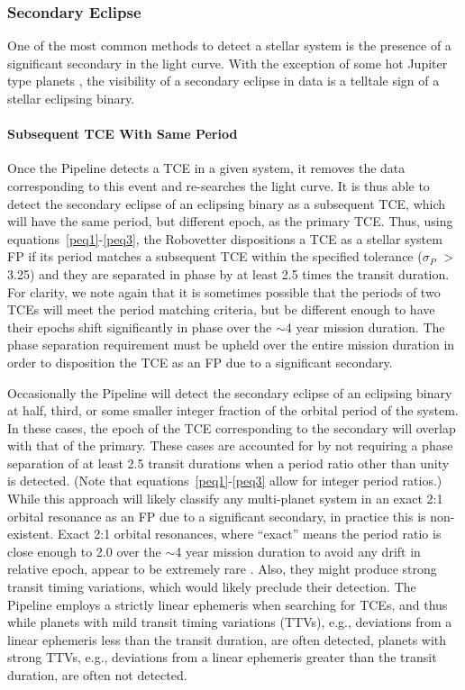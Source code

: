 \subsubsection{Secondary Eclipse}

One of the most common methods to detect a stellar system is the presence of a significant secondary in the light curve. With the exception of some hot Jupiter type planets \citep[e.g., HAT-P-7,][]{Borucki2009}, the visibility of a secondary eclipse in \kepler{} data is a telltale sign of a stellar eclipsing binary.


\paragraph{Subsequent TCE With Same Period}
\label{s:secondTce}
Once the \kepler{} Pipeline detects a TCE in a given system, it removes the data corresponding to this event and re-searches the light curve. It is thus able to detect the secondary eclipse of an eclipsing binary as a subsequent TCE, which will have the same period, but different epoch, as the primary TCE. Thus, using equations~\ref{peq1}-\ref{peq3}, the Robovetter dispositions a TCE as a stellar system FP if its period matches a subsequent TCE within the specified tolerance ($\sigma_{P}$ $>$ 3.25) and they are separated in phase by at least 2.5 times the transit duration. For clarity, we note again that it is sometimes possible that the periods of two TCEs will meet the period matching criteria, but be different enough to have their epochs shift significantly in phase over the $\sim$4 year mission duration. The phase separation requirement must be upheld over the entire mission duration in order to disposition the TCE as an FP due to a significant secondary.  

Occasionally the \kepler{} Pipeline will detect the secondary eclipse of an eclipsing binary at half, third, or some smaller integer fraction of the orbital period of the system. In these cases, the epoch of the TCE corresponding to the secondary will overlap with that of the primary. These cases are accounted for by not requiring a phase separation of at least 2.5 transit durations when a period ratio other than unity is detected. (Note that equations~\ref{peq1}-\ref{peq3} allow for integer period ratios.) While this approach will likely classify any multi-planet system in an exact 2:1 orbital resonance as an FP due to a significant secondary, in practice this is non-existent. Exact 2:1 orbital resonances, where ``exact'' means the period ratio is close enough to 2.0 over the $\sim$4 year mission duration to avoid any drift in relative epoch, appear to be extremely rare \citep{Fabrycky2014}. Also, they might produce strong transit timing variations, which would likely preclude their detection. The \kepler{} Pipeline employs a strictly linear ephemeris when searching for TCEs, and thus while planets with mild transit timing variations (TTVs), e.g., deviations from a linear ephemeris less than the transit duration, are often detected, planets with strong TTVs, e.g., deviations from a linear ephemeris greater than the transit duration, are often not detected.



